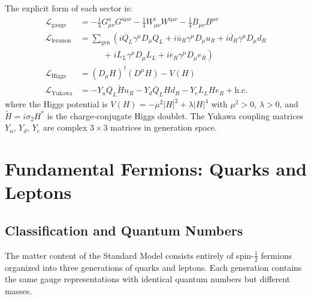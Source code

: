 \documentclass[12pt]{article}
\theoremstyle{definition}
\theoremstyle{remark}
\newcommand{\Lagr}{\mathcal{L}}
\newcommand{\Qbar}{\overline{Q}}
\newcommand{\Lbar}{\overline{L}}
\newcommand{\ubar}{\overline{u}}
\newcommand{\dbar}{\overline{d}}
\newcommand{\ebar}{\overline{e}}
\newcommand{\Htilde}{\widetilde{H}}
\begin{document}
The explicit form of each sector is:
\begin{align}
\Lagr_{\mathrm{gauge}} &= -\frac{1}{4} G^a_{\mu\nu} G^{a\mu\nu} - \frac{1}{4} W^i_{\mu\nu} W^{i\mu\nu} - \frac{1}{4} B_{\mu\nu} B^{\mu\nu} \label{eq:lgauge}\\
\Lagr_{\mathrm{fermion}} &= \sum_{\mathrm{gen}} \left( i\Qbar_L \gamma^\mu D_\mu Q_L + i\ubar_R \gamma^\mu D_\mu u_R + i\dbar_R \gamma^\mu D_\mu d_R \right. \nonumber \\
&\quad\quad\quad \left. + \; i\Lbar_L \gamma^\mu D_\mu L_L + i\ebar_R \gamma^\mu D_\mu e_R \right) \label{eq:lfermion}\\
\Lagr_{\mathrm{Higgs}} &= (D_\mu H)^\dagger (D^\mu H) - V(H) \label{eq:lhiggs}\\
\Lagr_{\mathrm{Yukawa}} &= -Y_u \Qbar_L \Htilde u_R - Y_d \Qbar_L H d_R - Y_e \Lbar_L H e_R + \mathrm{h.c.} \label{eq:lyukawa}
\end{align}
where the Higgs potential is $V(H) = -\mu^2 |H|^2 + \lambda |H|^4$ with $\mu^2 > 0$, $\lambda > 0$, and $\Htilde = i\sigma_2 H^*$ is the charge-conjugate Higgs doublet. The Yukawa coupling matrices $Y_u$, $Y_d$, $Y_e$ are complex $3 \times 3$ matrices in generation space.

\section{Fundamental Fermions: Quarks and Leptons}
\label{sec:fermions}

\subsection{Classification and Quantum Numbers}

The matter content of the Standard Model consists entirely of spin-$\frac{1}{2}$ fermions organized into three generations of quarks and leptons. Each generation contains the same gauge representations with identical quantum numbers but different masses.
\end{document}
